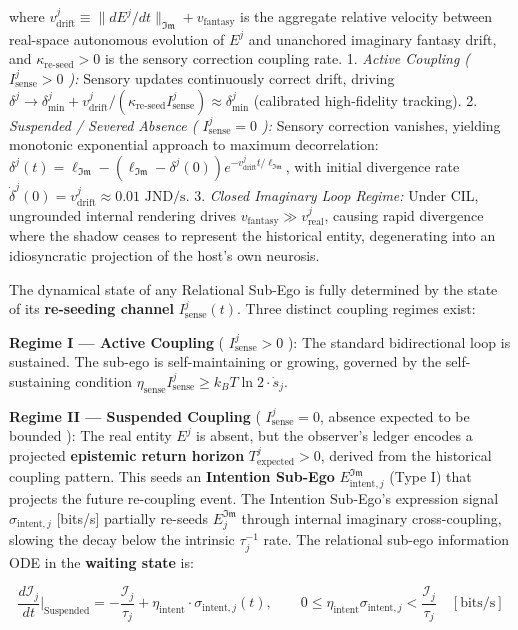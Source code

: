 \documentclass[11pt,a4paper]{article}
\theoremstyle{definition}
\theoremstyle{remark}
\begin{document}
where $v_{\text{drift}}^j \equiv \|dE^j/dt\|_{\mathfrak{Im}} + v_{\text{fantasy}}$ is the aggregate relative velocity between real-space autonomous evolution of $E^j$ and unanchored imaginary fantasy drift, and $\kappa_{\text{re-seed}} > 0$ is the sensory correction coupling rate.
1. \textit{Active Coupling ( $I_{\text{sense}}^j > 0$ ):} Sensory updates continuously correct drift, driving $\delta^j \to \delta_{\min}^j + v_{\text{drift}}^j / (\kappa_{\text{re-seed}} I_{\text{sense}}^j) \approx \delta_{\min}^j$ (calibrated high-fidelity tracking).
2. \textit{Suspended / Severed Absence ( $I_{\text{sense}}^j = 0$ ):} Sensory correction vanishes, yielding monotonic exponential approach to maximum decorrelation: $\delta^j(t) = \ell_{\mathfrak{Im}} - (\ell_{\mathfrak{Im}} - \delta^j(0)) e^{-v_{\text{drift}}^j t / \ell_{\mathfrak{Im}}}$, with initial divergence rate $\dot{\delta}^j(0) = v_{\text{drift}}^j \approx 0.01\text{ JND/s}$.
3. \textit{Closed Imaginary Loop Regime:} Under CIL, ungrounded internal rendering drives $v_{\text{fantasy}} \gg v_{\text{real}}^j$, causing rapid divergence where the shadow ceases to represent the historical entity, degenerating into an idiosyncratic projection of the host's own neurosis.

The dynamical state of any Relational Sub-Ego is fully determined by the state of its \textbf{re-seeding channel} $I_{\text{sense}}^j(t)$. Three distinct coupling regimes exist:

\textbf{Regime I — Active Coupling} ( $I_{\text{sense}}^j > 0$ ): The standard bidirectional loop is sustained. The sub-ego is self-maintaining or growing, governed by the self-sustaining condition $\eta_{\text{sense}} I_{\text{sense}}^j \geq k_B T \ln 2 \cdot \dot{s}_j$.

\textbf{Regime II — Suspended Coupling} ( $I_{\text{sense}}^j = 0$, absence expected to be bounded ): The real entity $E^j$ is absent, but the observer's ledger encodes a projected \textbf{epistemic return horizon} $T_{\text{expected}}^j > 0$, derived from the historical coupling pattern. This seeds an \textbf{Intention Sub-Ego} $E_{\text{intent},j}^{\mathfrak{Im}}$ (Type I) that projects the future re-coupling event. The Intention Sub-Ego's expression signal $\sigma_{\text{intent},j}$ [bits/s] partially re-seeds $E_j^{\mathfrak{Im}}$ through internal imaginary cross-coupling, slowing the decay below the intrinsic $\tau_j^{-1}$ rate. The relational sub-ego information ODE in the \textbf{waiting state} is:


\begin{equation}
\boxed{\frac{d\mathcal{I}_j}{dt}\Bigg|_{\text{Suspended}} = -\frac{\mathcal{I}_j}{\tau_j} + \eta_{\text{intent}} \cdot \sigma_{\text{intent},j}(t), \qquad 0 \leq \eta_{\text{intent}} \sigma_{\text{intent},j} < \frac{\mathcal{I}_j}{\tau_j} \quad [\text{bits/s}]}
\end{equation}
\end{document}
